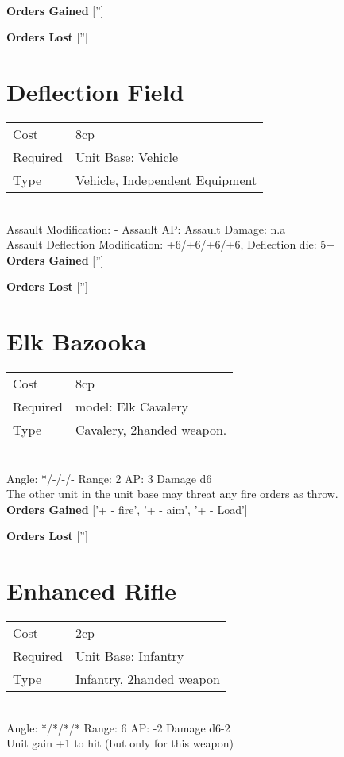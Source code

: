 \ \\

{\bf Orders Gained}
['']

{\bf Orders Lost}
['']
\section{ Deflection Field }

\begin{tabular}{ll}
    Cost & 8cp \\
    Required & Unit Base: Vehicle\\
    Type & Vehicle, Independent Equipment\\
\end{tabular}
\ \\
Assault Modification: - Assault AP:  Assault Damage: n.a\\
Assault Deflection Modification: +6/+6/+6/+6, Deflection die: 5+ \\




{\bf Orders Gained}
['']

{\bf Orders Lost}
['']
\section{ Elk Bazooka }

\begin{tabular}{ll}
    Cost & 8cp \\
    Required & model: Elk Cavalery\\
    Type & Cavalery, 2handed weapon.\\
\end{tabular}
\ \\
\indent Angle: */-/-/- Range: 2  AP: 3 Damage d6 \\
The other unit in the unit base may threat any fire orders as throw.
\ \\

{\bf Orders Gained}
['+ - fire', '+ - aim', '+ - Load']

{\bf Orders Lost}
['']
\section{ Enhanced Rifle }

\begin{tabular}{ll}
    Cost & 2cp \\
    Required & Unit Base: Infantry\\
    Type & Infantry, 2handed weapon\\
\end{tabular}
\ \\
\indent Angle: */*/*/* Range: 6  AP: -2 Damage d6-2 \\
Unit gain +1 to hit (but only for this weapon)
\ \\

